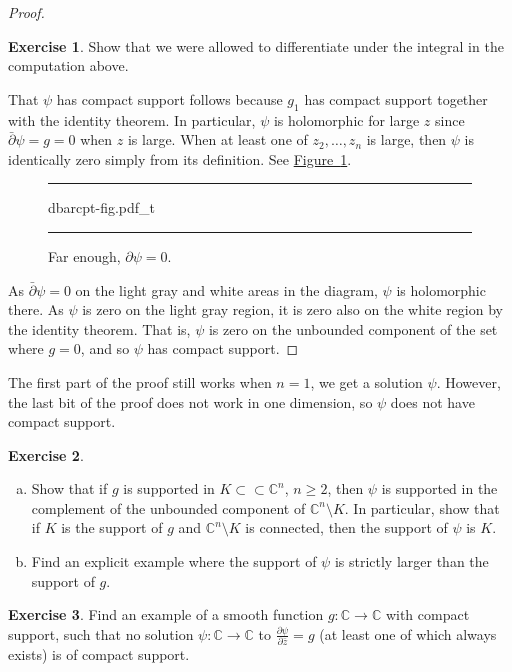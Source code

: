 \documentclass[12pt,openany]{book}
\newcommand{\C}{{\mathbb{C}}}
\theoremstyle{plain}
\theoremstyle{remark}
\theoremstyle{definition}
\newenvironment{exbox}{%
    \def\FrameCommand{\vrule width 1pt \relax\hspace{10pt}}%
    \MakeFramed{\advance\hsize-\width\FrameRestore}%
}{%
    \endMakeFramed
}
\newenvironment{exparts}{%
    \leavevmode\begin{enumerate}[a),noitemsep,topsep=0pt,parsep=0pt,partopsep=0pt]
}{%
    \end{enumerate}
}
\newenvironment{myfig}{%
\begin{figure}[h!t]
\noindent\rule{\textwidth}{0.5pt}\vspace{12pt}\par\centering}%
{\par\noindent\rule{\textwidth}{0.5pt}
\end{figure}}
\theoremstyle{exercise}
\newtheorem{exercise}{Exercise}[section]
\theoremstyle{example}
\newcommand{\figureref}[1]{\hyperref[#1]{Figure~\ref*{#1}}}
\begin{document}
\begin{proof}
\begin{exbox}
\begin{exercise}
Show that we were allowed to differentiate under the integral in the
computation above.
\end{exercise}
\end{exbox}

That $\psi$ has compact support follows because $g_1$ has compact
support together with the identity theorem.  In particular, $\psi$ is
holomorphic for large $z$ since $\bar{\partial} \psi = g = 0$ when $z$
is large.  When at least one of $z_2,\ldots,z_n$ is large,
then $\psi$ is identically zero
simply from its definition.  See \figureref{fig:dbarcpt-fig}.

\begin{myfig}
{dbarcpt-fig.pdf_t}
\caption{Far enough, $\partial \psi = 0$.\label{fig:dbarcpt-fig}}
\end{myfig}

As $\bar{\partial} \psi = 0$ on the light gray and white areas in the
diagram, $\psi$ is holomorphic there. As $\psi$ is zero on the light
gray region, it is zero also on the white region by the identity theorem.
That is, $\psi$ is zero on the unbounded component of the set where $g=0$,
and so $\psi$ has compact support.
\end{proof}

The first part of the proof still works when $n=1$, we get a solution
$\psi$.  However, the last bit of the proof does not work in one dimension, so
$\psi$ does not have compact support.

\begin{exbox}
\begin{exercise} \label{exercise:supportofpsi}
\begin{exparts}
\item
Show that if $g$ is supported in $K \subset \subset \C^n$, $n \geq 2$,
then $\psi$ is supported in the complement of the unbounded component
of $\C^n \setminus K$.  In particular, show that if $K$ is the support of
$g$ and $\C^n \setminus K$ is connected, then the support of
$\psi$ is $K$.
\item
Find an explicit example where the support of $\psi$ is strictly larger
than the support of $g$.
\end{exparts}
\end{exercise}

\begin{exercise}
Find an example of a smooth function $g \colon \C \to \C$ with compact
support, such that no solution $\psi \colon \C \to \C$ to
$\frac{\partial \psi}{\partial \bar{z}} = g$ (at least one of which always exists) is
of compact support.
\end{exercise}
\end{exbox}
\end{document}
